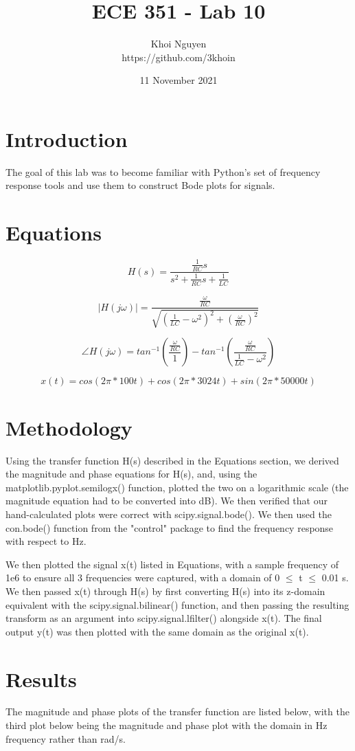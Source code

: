 \documentclass[11pt,a4,titlepage]{article}
\title{ECE 351 - Lab 10}
\author{Khoi Nguyen \\ https://github.com/3khoin}
\date{11 November 2021}
\begin{document}
\maketitle
\pagebreak

\tableofcontents
\pagebreak

\section{Introduction}
The goal of this lab was to become familiar with Python's set of frequency response tools and use them to construct Bode plots for signals.

\section{Equations}
\[H(s) = \frac{\frac{1}{RC}s}{s^{2} + \frac{1}{RC}s + \frac{1}{LC}}\]

\[|H(j\omega)| = \frac{\frac{\omega}{RC}}{\sqrt{(\frac{1}{LC} - \omega^2)^{2} + (\frac{\omega}{RC})^{2}}}\]

\[\angle H(j\omega) = tan^{-1}(\frac{\frac{\omega}{RC}}{1}) - tan^{-1}(\frac{\frac{\omega}{RC}}{\frac{1}{LC} - \omega^{2}})\]

\[x(t) = cos(2\pi * 100t) + cos(2\pi * 3024t) + sin(2\pi * 50000t)\]

\section{Methodology}
Using the transfer function H(s) described in the Equations section, we derived the magnitude and phase equations for H(s), and, using the matplotlib.pyplot.semilogx() function, plotted the two on a logarithmic scale (the magnitude equation had to be converted into dB). We then verified that our hand-calculated plots were correct with scipy.signal.bode(). We then used the con.bode() function from the "control" package to find the frequency response with respect to Hz.

We then plotted the signal x(t) listed in Equations, with a sample frequency of 1e6 to ensure all 3 frequencies were captured, with a domain of 0 $\leq$ t $\leq$ 0.01 s. We then passed x(t) through H(s) by first converting H(s) into its z-domain equivalent with the scipy.signal.bilinear() function, and then passing the resulting transform as an argument into scipy.signal.lfilter() alongside x(t). The final output y(t) was then plotted with the same domain as the original x(t).

\section{Results}
The magnitude and phase plots of the transfer function are listed below, with the third plot below being the magnitude and phase plot with the domain in Hz frequency rather than rad/s.
\end{document}
